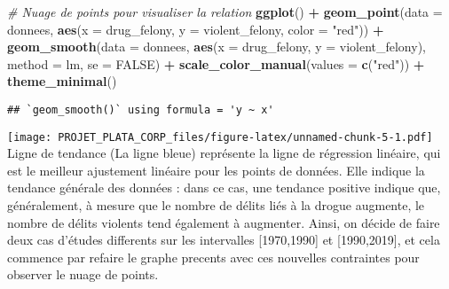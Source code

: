 \documentclass[
]{article}
\newenvironment{Shaded}{\begin{snugshade}}{\end{snugshade}}
\newcommand{\AttributeTok}[1]{\textcolor[rgb]{0.13,0.29,0.53}{#1}}
\newcommand{\CommentTok}[1]{\textcolor[rgb]{0.56,0.35,0.01}{\textit{#1}}}
\newcommand{\ConstantTok}[1]{\textcolor[rgb]{0.56,0.35,0.01}{#1}}
\newcommand{\FunctionTok}[1]{\textcolor[rgb]{0.13,0.29,0.53}{\textbf{#1}}}
\newcommand{\NormalTok}[1]{#1}
\newcommand{\SpecialCharTok}[1]{\textcolor[rgb]{0.81,0.36,0.00}{\textbf{#1}}}
\newcommand{\StringTok}[1]{\textcolor[rgb]{0.31,0.60,0.02}{#1}}
\begin{document}
\begin{Shaded}
\begin{Highlighting}[]
\CommentTok{\# Nuage de points pour visualiser la relation}
\FunctionTok{ggplot}\NormalTok{() }\SpecialCharTok{+} 
  \FunctionTok{geom\_point}\NormalTok{(}\AttributeTok{data =}\NormalTok{ donnees, }\FunctionTok{aes}\NormalTok{(}\AttributeTok{x =}\NormalTok{ drug\_felony, }\AttributeTok{y =}\NormalTok{ violent\_felony, }\AttributeTok{color =} \StringTok{"red"}\NormalTok{)) }\SpecialCharTok{+}
  \FunctionTok{geom\_smooth}\NormalTok{(}\AttributeTok{data =}\NormalTok{ donnees, }\FunctionTok{aes}\NormalTok{(}\AttributeTok{x =}\NormalTok{ drug\_felony, }\AttributeTok{y =}\NormalTok{ violent\_felony), }\AttributeTok{method =}\NormalTok{ lm, }\AttributeTok{se =} \ConstantTok{FALSE}\NormalTok{) }\SpecialCharTok{+}
  \FunctionTok{scale\_color\_manual}\NormalTok{(}\AttributeTok{values =} \FunctionTok{c}\NormalTok{(}\StringTok{"red"}\NormalTok{)) }\SpecialCharTok{+}
  \FunctionTok{theme\_minimal}\NormalTok{()}
\end{Highlighting}
\end{Shaded}

\begin{verbatim}
## `geom_smooth()` using formula = 'y ~ x'
\end{verbatim}

\texttt{[image: PROJET\_PLATA\_CORP\_files/figure-latex/unnamed-chunk-5-1.pdf]}
Ligne de tendance (La ligne bleue) représente la ligne de régression
linéaire, qui est le meilleur ajustement linéaire pour les points de
données. Elle indique la tendance générale des données : dans ce cas,
une tendance positive indique que, généralement, à mesure que le nombre
de délits liés à la drogue augmente, le nombre de délits violents tend
également à augmenter. Ainsi, on décide de faire deux cas d'études
differents sur les intervalles {[}1970,1990{]} et {[}1990,2019{]}, et
cela commence par refaire le graphe precents avec ces nouvelles
contraintes pour observer le nuage de points.
\end{document}
